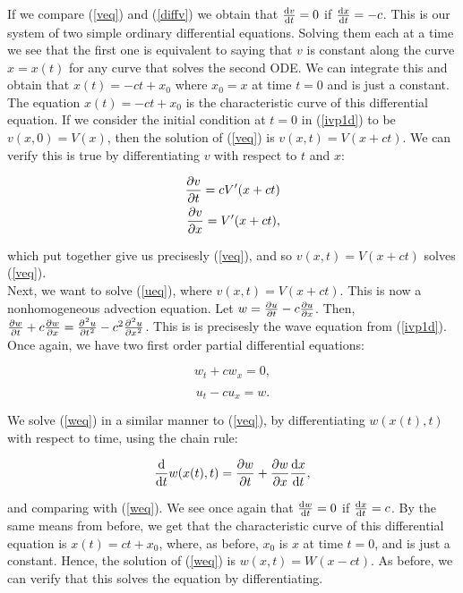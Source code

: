 \documentclass[12pt]{article}
\numberwithin{equation}{section}
\begin{document}
If we compare (\ref{veq}) and (\ref{diffv}) we obtain that $\diff{v}{t}=0$ if $\diff{x}{t}=-c$. This is our system of two simple ordinary differential 
equations. Solving them each at a time we see that the first one is equivalent to saying that $v$ is constant along the curve $x=x(t)$ for any curve that 
solves the second ODE. We can integrate this and obtain that $x(t)=-ct+x_0$ where $x_0=x$ at time $t=0$ and is just a constant. The equation $x(t)=-ct+x_0$
is the characteristic curve of this differential equation. If we consider the initial condition at $t=0$ in (\ref{ivp1d}) to be $v(x,0)=V(x)$, then the 
solution of (\ref{veq}) is $v(x,t)=V(x+ct)$. We can verify this is true by differentiating $v$ with respect to $t$ and $x$:

\begin{equation*}
    \begin{aligned}
    \diffp[1]{v}{t}=cV'(x+ct)\\
    \diffp[1]{v}{x}=V'(x+ct),
    \end{aligned}
\end{equation*}

which put together give us precisesly (\ref{veq}), and so $v(x,t)=V(x+ct)$ solves (\ref{veq}).
\\

Next, we want to solve (\ref{ueq}), where $v(x,t)=V(x+ct)$. This is now a nonhomogeneous advection equation. Let $w=\diffp[1]{u}{t}-c\diffp{u}{x}$. Then, 
$\diffp[1]{w}{t}+c\diffp{w}{x}=\diffp[2]{u}{t}-c^2\diffp[2]{u}{x}$. This is is precisesly the wave equation from (\ref{ivp1d}). Once again, we have two first
order partial differential equations:

\begin{equation} 
    \label{weq}
    w_t+cw_x=0, 
\end{equation}

\begin{equation}
    \label{ueqw}
    u_t-cu_x=w. 
\end{equation}

We solve (\ref{weq}) in a similar manner to (\ref{veq}), by differentiating $w(x(t),t)$ with respect to time, using the chain rule:

\begin{equation} \label{diffw}
    \diff{}{t}w(x(t),t)=\diffp[1]{w}{t}+\diffp[1]{w}{x}\diff{x}{t}, 
\end{equation}

and comparing with (\ref{weq}). We see once again that $\diff{w}{t}=0$ if $\diff{x}{t}=c$. By the same means from before, we get that the characteristic 
curve of this differential equation is $x(t)=ct+x_0$, where, as before, $x_0$ is $x$ at time $t=0$, and is just a constant. Hence, the solution of (\ref{weq})
is $w(x,t)=W(x-ct)$. As before, we can verify that this solves the equation by differentiating.
\end{document}
